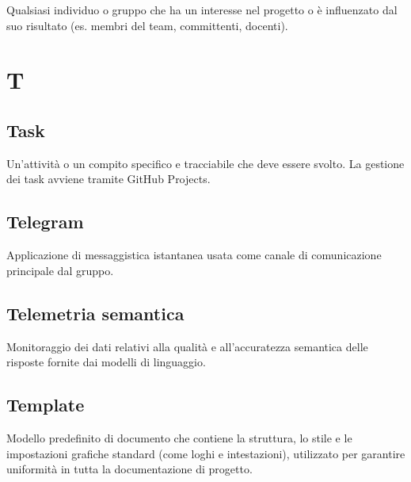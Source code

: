 \documentclass[a4paper, 11pt, oneside]{scrartcl} %
\begin{document}

Qualsiasi individuo o gruppo che ha un interesse nel progetto o è influenzato dal suo risultato (es. membri del team, committenti, docenti).

\vspace{0.5cm}


\section*{T}


\subsection*{Task}


Un'attività o un compito specifico e tracciabile che deve essere svolto. La gestione dei task avviene tramite GitHub Projects.

\vspace{0.5cm}

\subsection*{Telegram}


Applicazione di messaggistica istantanea usata come canale di comunicazione principale dal gruppo.

\vspace{0.5cm}

\subsection*{Telemetria semantica}
Monitoraggio dei dati relativi alla qualità e all'accuratezza semantica delle risposte fornite dai modelli di linguaggio.
\vspace{0.5cm}

\subsection*{Template}
Modello predefinito di documento che contiene la struttura, lo stile e le impostazioni grafiche standard (come loghi e intestazioni), utilizzato per garantire uniformità in tutta la documentazione di progetto.
\vspace{0.5cm}
\end{document}
